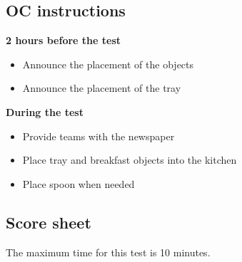 \subsection{OC instructions}

\textbf{2 hours before the test}
\begin{itemize}
\item Announce the placement of the objects
\item Announce the placement of the tray

\end{itemize}
\textbf{During the test}
\begin{itemize}
\item Provide teams with the newspaper
\item Place tray and breakfast objects into the kitchen
\item Place spoon when needed
\end{itemize}

\subsection{Score sheet}
The maximum time for this test is 10 minutes.

